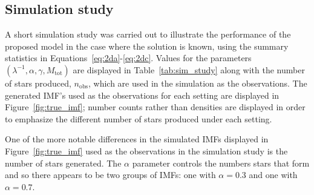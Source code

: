 \documentclass[12pt]{article}
\newcommand{\nobs}{n_{\text{obs}}}
\newcommand{\Mtot}{M_{\text{tot}}}
\begin{document}
\subsection{Simulation study}
A short simulation study was carried out to illustrate the performance of the proposed model in the case where the solution is known, using the summary statistics in Equations~\eqref{eq:2da}-\eqref{eq:2dc}.  Values for the parameters $(\lambda^{-1}, \alpha, \gamma, \Mtot)$ are displayed in Table~\ref{tab:sim_study} along with the number of stars produced, $\nobs$, which are used in the simulation as the observations.  The generated IMF's used as the observations for each setting are displayed in Figure~\ref{fig:true_imf}; number counts rather than densities are displayed in order to emphasize the different number of stars produced under each setting.


One of the more notable differences in the simulated IMFs displayed in Figure~\ref{fig:true_imf} used as the observations in the simulation study is the number of stars generated.  The $\alpha$ parameter controls the numbers stars that form and so there appears to be two groups of IMFs:  one with $\alpha = 0.3$ and one with $\alpha = 0.7$.  
\end{document}
